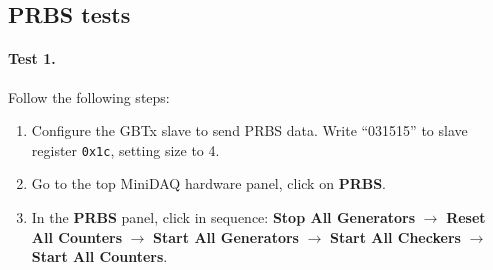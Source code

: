 \subsection{PRBS tests}

\paragraph{Test 1.} Follow the following steps:
\begin{enumerate}
    \item Configure the GBTx slave to send PRBS data. Write ``031515'' to slave
        register \texttt{0x1c}, setting size to 4.
    \item Go to the top MiniDAQ hardware panel, click on \textbf{PRBS}.
    \item In the \textbf{PRBS} panel, click in sequence:
        \textbf{Stop All Generators} $\to$ \textbf{Reset All Counters} $\to$
        \textbf{Start All Generators} $\to$ \textbf{Start All Checkers} $\to$
        \textbf{Start All Counters}.
\end{enumerate}
